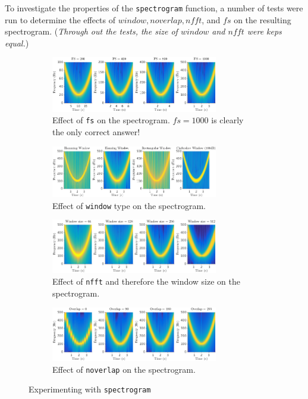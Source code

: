 \documentclass[main.tex]{subfiles}
\begin{document}
To investigate the properties of the {\tt spectrogram} function, a number of tests were run to determine the effects of $window, noverlap, nfft$, and $fs$ on the resulting spectrogram. (\textit{Through out the tests, the size of $window$ and $nfft$ were keps equal.})

\begin{figure}[H]
	\centering
	\begin{subfigure}[b]{\textwidth}
		\centering
		\includegraphics[width=0.8\textwidth]{images/2-3-a-1.png}
		\caption{Effect of {\tt fs} on the spectrogram. $fs=1000$ is clearly the only correct answer!}
		\label{fig:2-3-a-1}
	\end{subfigure}%
	
	\begin{subfigure}[b]{\textwidth}
		\centering
		\includegraphics[width=0.8\textwidth]{images/2-3-a-2.png}
		\caption{Effect of {\tt window} type on the spectrogram.}
		\label{fig:2-3-a-2}
	\end{subfigure}
	
	\begin{subfigure}[b]{\textwidth}
		\centering
		\includegraphics[width=0.8\textwidth]{images/2-3-a-3.png}
		\caption{Effect of {\tt nfft} and therefore the window size on the spectrogram.}
		\label{fig:2-3-a-3}
	\end{subfigure}
	
	\begin{subfigure}[b]{\textwidth}
		\centering
		\includegraphics[width=0.8\textwidth]{images/2-3-a-4.png}
		\caption{Effect of {\tt noverlap} on the spectrogram.}
		\label{fig:2-3-a-4}
	\end{subfigure}
	\caption{Experimenting with {\tt spectrogram}}
	\label{fig:2-3-a}
\end{figure}
\end{document}
